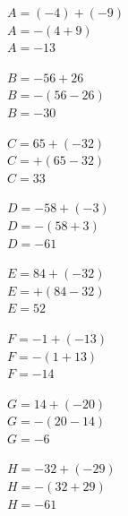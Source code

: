 \documentclass[a4paper]{book}
\begin{document}
{\begin{exercice}
        \begin{minipage}{0.23\linewidth}
            $A=(-4)+(-9)$\\
            $A=-(4+9)$\\
            $A=-13$
        \end{minipage}
        \hfill
        \vline
        \hfill
        \begin{minipage}{0.23\linewidth}
            $B=-56+26$\\
            $B=-(56-26)$\\
            $B=-30$
        \end{minipage}
        \hfill
        \vline
        \hfill
        \begin{minipage}{0.23\linewidth}
            $C=65+(-32)$\\
            $C=+(65-32)$\\
            $C=33$
        \end{minipage}
        \hfill
        \vline
        \hfill
        \begin{minipage}{0.23\linewidth}
            $D=-58+(-3)$\\
            $D=-(58+3)$\\
            $D=-61$
        \end{minipage}  

        \bigskip

        \begin{minipage}{0.23\linewidth}
            $E=84+(-32)$\\
            $E=+(84-32)$\\
            $E=52$
        \end{minipage}
        \hfill
        \vline
        \hfill
        \begin{minipage}{0.23\linewidth}
            $F=-1+(-13)$\\
            $F=-(1+13)$\\
            $F=-14$
        \end{minipage}
        \hfill
        \vline
        \hfill
        \begin{minipage}{0.23\linewidth}
            $G=14+(-20)$\\
            $G=-(20-14)$\\
            $G=-6$
        \end{minipage}
        \hfill
        \vline
        \hfill
        \begin{minipage}{0.23\linewidth}
            $H=-32+(-29)$\\
            $H=-(32+29)$\\
            $H=-61$
        \end{minipage}   
    \end{exercice}


}
\end{document}
